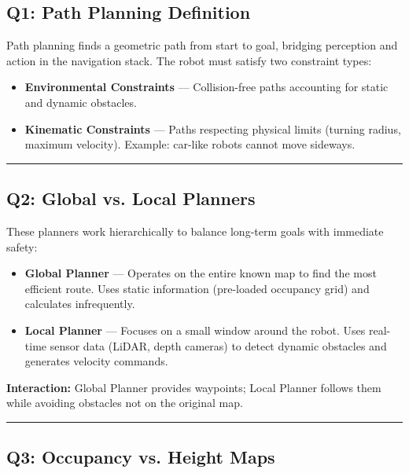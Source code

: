 \documentclass[12pt,a4paper]{article}
\begin{document}
\subsection{Q1: Path Planning Definition}

Path planning finds a geometric path from start to goal, bridging perception and action in the navigation stack. The robot must satisfy two constraint types:

\begin{itemize}[leftmargin=*]
    \item \textbf{Environmental Constraints} — Collision-free paths accounting for static and dynamic obstacles.
    \item \textbf{Kinematic Constraints} — Paths respecting physical limits (turning radius, maximum velocity). Example: car-like robots cannot move sideways.
\end{itemize}

\vspace{0.3em}
\noindent\rule{\textwidth}{0.4pt}
\vspace{0.3em}

\subsection{Q2: Global vs. Local Planners}

These planners work hierarchically to balance long-term goals with immediate safety:

\begin{itemize}[leftmargin=*]
    \item \textbf{Global Planner} — Operates on the entire known map to find the most efficient route. Uses static information (pre-loaded occupancy grid) and calculates infrequently.
    
    \item \textbf{Local Planner} — Focuses on a small window around the robot. Uses real-time sensor data (LiDAR, depth cameras) to detect dynamic obstacles and generates velocity commands.
\end{itemize}

\noindent\textbf{Interaction:} Global Planner provides waypoints; Local Planner follows them while avoiding obstacles not on the original map.

\vspace{0.3em}
\noindent\rule{\textwidth}{0.4pt}
\vspace{0.3em}

\subsection{Q3: Occupancy vs. Height Maps}
\end{document}
